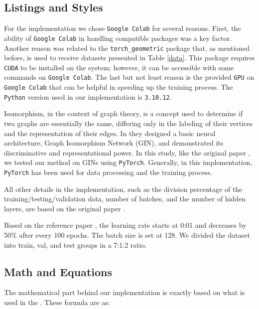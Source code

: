 \documentclass[sigconf, nonacm]{acmart}
\begin{document}
\subsection{Listings and Styles}

For the implementation we chose \texttt{Google Colab} for several reasons. First, the ability of \texttt{Google Colab} in handling compatible packages was a key factor. Another reason was related to the \texttt{torch\_geometric} package that, as mentioned before, is used to receive datasets presented in Table \ref{data}. This package requires \texttt{CUDA} to be installed on the system; however, it can be accessible with some commands on \texttt{Google Colab}. The last but not least reason is the provided \texttt{GPU} on \texttt{Google Colab} that can be helpful in speeding up the training process. The \texttt{Python} version used in our implementation is \texttt{3.10.12}.

Isomorphism, in the context of graph theory, is a concept used to determine if two graphs are essentially the same, differing only in the labeling of their vertices and the representation of their edges. In \cite{xu2018powerful} they designed a basic neural architecture, Graph Isomorphism Network (GIN), and demonstrated its discriminative and representational power. In this study, like the original paper \cite{han2022g}, we tested our method on GINs using \texttt{PyTorch}. Generally, in this implementation, \texttt{PyTorch} has been used for data processing and the training process.

All other details in the implementation, such as the division percentage of the training/testing/validation data, number of batches, and the number of hidden layers, are based on the original paper \cite{han2022g}.

Based on the reference paper \cite{han2022g}, the learning rate starts at 0:01 and decreases by 50\% after every 100 epochs. The batch size is set at 128. We divided the dataset into train, val, and test groups in a 7:1:2 ratio. 

\subsection{Math and Equations}

The mathematical part behind our implementation is exactly based on what is used in the \cite{han2022g}. These formula are as:
\end{document}

